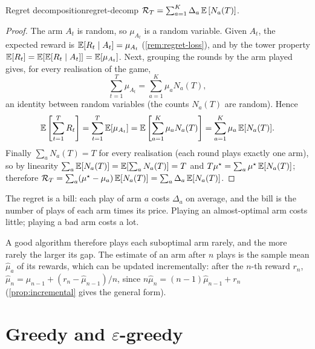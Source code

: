 \begin{proposition}{Regret decomposition}{regret-decomp}
  $\mathcal{R}_T = \sum_{a=1}^{K} \Delta_a\, \mathbb{E}\left[N_a(T)\right]$.
\end{proposition}

\begin{proof}
  The arm $A_t$ is random, so $\mu_{A_t}$ is a random variable. Given $A_t$,
  the expected reward is $\mathbb{E}[R_t \mid A_t] = \mu_{A_t}$
  (\cref{rem:regret-loss}), and by the tower property $\mathbb{E}[R_t] =
  \mathbb{E}[\mathbb{E}[R_t \mid A_t]] = \mathbb{E}[\mu_{A_t}]$. Next, grouping the rounds by the
  arm played gives, for every realisation of the game,
  \begin{equation*}
    \sum_{t=1}^{T} \mu_{A_t} = \sum_{a=1}^{K} \mu_a N_a(T),
  \end{equation*}
  an identity between random variables (the counts $N_a(T)$ are random).
  Hence
  \begin{equation*}
    \mathbb{E}\left[\sum_{t=1}^{T} R_t\right] = \sum_{t=1}^{T} \mathbb{E}[\mu_{A_t}] =
    \mathbb{E}\left[\sum_{a=1}^{K} \mu_a N_a(T)\right] = \sum_{a=1}^{K} \mu_a\,
    \mathbb{E}[N_a(T)].
  \end{equation*}
  Finally $\sum_a N_a(T) = T$ for every realisation (each round plays
  exactly one arm), so by linearity $\sum_a \mathbb{E}[N_a(T)] = \mathbb{E}[\sum_a N_a(T)]
  = T$ and $T \mu^\star = \sum_a \mu^\star\, \mathbb{E}[N_a(T)]$; therefore
  $\mathcal{R}_T = \sum_a (\mu^\star - \mu_a)\, \mathbb{E}[N_a(T)] = \sum_a
  \Delta_a\, \mathbb{E}[N_a(T)]$.
\end{proof}

\begin{intuition}
  The regret is a bill: each play of arm $a$ costs $\Delta_a$ on average,
  and the bill is the number of plays of each arm times its price. Playing
  an almost-optimal arm costs little; playing a bad arm costs a lot.
\end{intuition}

A good algorithm therefore plays each suboptimal arm rarely, and the more
rarely the larger its gap. The estimate of an arm after $n$ plays is the
sample mean $\hat\mu_a$ of its rewards, which can be updated incrementally:
after the $n$-th reward $r_n$, $\hat\mu_n = \hat\mu_{n-1} + (r_n -
\hat\mu_{n-1}) / n$, since $n \hat\mu_n = (n - 1) \hat\mu_{n-1} + r_n$
(\cref{prop:incremental} gives the general form).

\section{Greedy and $\varepsilon$-greedy}

